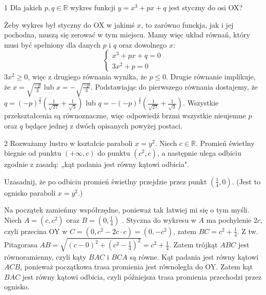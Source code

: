 \documentclass{../note}
\begin{document}
\begin{zadanie}{1}
Dla jakich $p, q \in \mathbb{R}$ wykres funkcji $y = x^3 + px + q$ jest styczny do osi OX?
\end{zadanie}
\begin{rozwiazanie}
Żeby wykres był styczny do OX w jakimś $x$, to zarówno funckja, jak i jej pochodna, muszą się zerować w tym miejscu. Mamy więc układ równań, który musi być spełniony dla danych $p$ i $q$ oraz dowolnego $x$:
\[\begin{cases}
    x^3 + px + q = 0\\
    3x^2 + p = 0
\end{cases}\]
$3x^2 \geq 0$, więc z drugiego równania wynika, że $p \leq 0$. Drugie równanie implikuje, że $x = \sqrt{\frac{-p}{3}}$ lub $x = -\sqrt{\frac{-p}{3}}$. Podstawiając do pierwszego równania dostajemy, że $q = (-p)^\frac32 \left(\frac{1}{\sqrt{27}} + \frac{1}{\sqrt3} \right)$ lub $q = -(-p)^\frac32 \left(\frac{1}{\sqrt{27}} + \frac{1}{\sqrt3} \right)$. Wszystkie przekształcenia są równoznaczne, więc odpowiedź brzmi wszystkie nieujemne $p$ oraz $q$ będące jednej z dwóch opisanych powyżej postaci.
\end{rozwiazanie}

\begin{zadanie}{2}
Rozważamy lustro w kształcie paraboli $x = y^2$. Niech $c \in \mathbb{R}$. Promień świetlny biegnie od punktu $(+\infty, c)$ do punktu $(c^2, c)$, a następnie ulega odbiciu zgodnie z zasadą: „kąt padania jest równy kątowi odbicia".

Uzasadnij, że po odbiciu promień świetlny przejdzie przez punkt $\left(\frac{1}{4}, 0\right)$. (Jest to ognisko paraboli $x = y^2$.)
\end{zadanie}
\begin{rozwiazanie}
Na początek zamieńmy współrzędne, ponieważ tak łatwiej mi się o tym myśli. Niech $A = (c, c^2)$ oraz $B = (0, \frac14)$ . Styczna do wykresu w $A$ ma pochylenie $2c$, czyli przecina OY w $C = (0, c^2 - 2c \cdot c) = (0, -c^2)$, zatem $BC = c^2 + \frac14$. Z tw. Pitagorasa $AB = \sqrt{(c - 0)^2 + (c^2 - \frac14)^2} = c^2 + \frac14$. Zatem trójkąt $ABC$ jest równoramienny, czyli kąty $BAC$ i $BCA$ są równe. Kąt padania jest równy kątowi $ACB$, ponieważ początkowa trasa promienia jest równoległa do OY. Zatem kąt $BAC$ jest równy kątowi odbicia, czyli późniejsza trasa promienia przechodzi przez ognisko.
\end{rozwiazanie}
\end{document}
